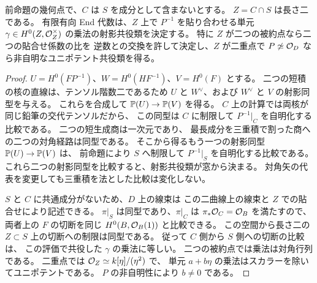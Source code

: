 \begin{corollary}[境界窓から復元されるPicard貼合せの射影作用]
\label{cor:qa-avatar-deep-glue-matrix}
前命題の幾何点で、$C$ は $S$ を成分として含まないとする。
$Z=C\cap S$ は長さ二である。
有限有向 End 代数は、$Z$ 上で $P^{-1}$ を貼り合わせる単元
$\gamma\in H^0(Z,\mathcal O_Z^\times)$ の乗法の射影共役類を決定する。
特に $Z$ が二つの被約点なら二つの貼合せ係数の比を
逆数との交換を許して決定し、$Z$ が二重点で
$P\not\simeq\mathcal O_D$ なら非自明なユニポテント共役類を得る。
\end{corollary}
\begin{proof}
$U=H^0(FP^{-1})$、$W=H^0(HF^{-1})$、$V=H^0(F)$ とする。
二つの短積の核の直線は、テンソル階数二であるため
$U$ と $W^\vee$、および $W^\vee$ と $V$ の射影同型を与える。
これらを合成して $\mathbb P(U)\to\mathbb P(V)$ を得る。
$C$ 上の計算では両核が同じ鉛筆の交代テンソルだから、
この同型は $C$ に制限して $P^{-1}|_C$ を自明化する比較である。
二つの短生成商は一次元であり、
最長成分を三重積で割った商への二つの対角経路は同型である。
そこから得るもう一つの射影同型 $\mathbb P(U)\to\mathbb P(V)$ は、
前命題により $S$ へ制限して $P^{-1}|_S$ を自明化する比較である。
これら二つの射影同型を比較すると、射影共役類が窓から決まる。
対角矢の代表を変更しても三重積を法とした比較は変化しない。

$S$ と $C$ に共通成分がないため、$D$ 上の線束は
この二曲線上の線束と $Z$ での貼合せにより記述できる。
$\pi|_S$ は同型であり、$\pi|_C$ は
$\pi_*\mathcal O_C=\mathcal O_B$ を満たすので、
両者上の $F$ の切断を同じ $H^0(B,\mathcal O_B(1))$ と比較できる。
この空間から長さ二の $Z\subset S$ 上の切断への制限は同型である。
従って $C$ 側から $S$ 側への切断の比較は、
この評価で共役した $\gamma$ の乗法に等しい。
二つの被約点では乗法は対角行列である。
二重点では $\mathcal O_Z\simeq k[\eta]/(\eta^2)$ で、
単元 $a+b\eta$ の乗法はスカラーを除いてユニポテントである。
$P$ の非自明性により $b\ne0$ である。
\end{proof}

